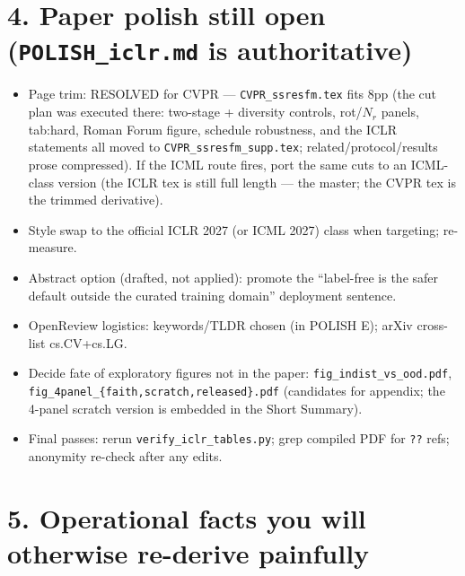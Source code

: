 \documentclass[11pt]{article}
\newcommand{\code}[1]{\texttt{\small #1}}
\begin{document}
\section*{4. Paper polish still open (\code{POLISH\_iclr.md} is authoritative)}

\begin{itemize}[leftmargin=1.4em,itemsep=2pt]
\item Page trim: RESOLVED for CVPR --- \code{CVPR\_ssresfm.tex} fits 8pp (the cut plan
was executed there: two-stage + diversity controls, rot/$N_r$ panels, tab:hard, Roman
Forum figure, schedule robustness, and the ICLR statements all moved to
\code{CVPR\_ssresfm\_supp.tex}; related/protocol/results prose compressed). If the ICML
route fires, port the same cuts to an ICML-class version (the ICLR tex is still full
length --- the master; the CVPR tex is the trimmed derivative).
\item Style swap to the official ICLR 2027 (or ICML 2027) class when targeting; re-measure.
\item Abstract option (drafted, not applied): promote the ``label-free is the safer default
outside the curated training domain'' deployment sentence.
\item OpenReview logistics: keywords/TLDR chosen (in POLISH E); arXiv cross-list cs.CV+cs.LG.
\item Decide fate of exploratory figures not in the paper: \code{fig\_indist\_vs\_ood.pdf},
\code{fig\_4panel\_\{faith,scratch,released\}.pdf} (candidates for appendix; the 4-panel scratch
version is embedded in the Short Summary).
\item Final passes: rerun \code{verify\_iclr\_tables.py}; grep compiled PDF for \code{??} refs;
anonymity re-check after any edits.
\end{itemize}

\section*{5. Operational facts you will otherwise re-derive painfully}
\end{document}
